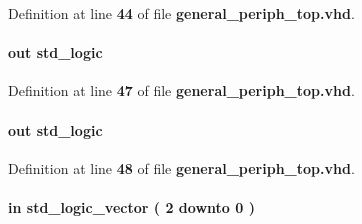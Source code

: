 Definition at line {\bf 44} of file {\bf general\+\_\+periph\+\_\+top.\+vhd}.

\paragraph[{led2\+\_\+g}]{ {\bfseries \textcolor{keywordflow}{out}\textcolor{vhdlchar}{ }} {\bfseries \textcolor{comment}{std\+\_\+logic}\textcolor{vhdlchar}{ }} \hspace{0.3cm}{\ttfamily [Port]}}\label{classgeneral__periph__top_a6b99286e836c933c4ee24d7e06ad22ed}


Definition at line {\bf 47} of file {\bf general\+\_\+periph\+\_\+top.\+vhd}.

\paragraph[{led2\+\_\+r}]{ {\bfseries \textcolor{keywordflow}{out}\textcolor{vhdlchar}{ }} {\bfseries \textcolor{comment}{std\+\_\+logic}\textcolor{vhdlchar}{ }} \hspace{0.3cm}{\ttfamily [Port]}}\label{classgeneral__periph__top_ada6ae8025a53618f0e28352b7c92c7f1}


Definition at line {\bf 48} of file {\bf general\+\_\+periph\+\_\+top.\+vhd}.

\paragraph[{led3\+\_\+ctrl}]{ {\bfseries \textcolor{keywordflow}{in}\textcolor{vhdlchar}{ }} {\bfseries \textcolor{comment}{std\+\_\+logic\+\_\+vector}\textcolor{vhdlchar}{ }\textcolor{vhdlchar}{(}\textcolor{vhdlchar}{ }\textcolor{vhdlchar}{ } \textcolor{vhdldigit}{2} \textcolor{vhdlchar}{ }\textcolor{keywordflow}{downto}\textcolor{vhdlchar}{ }\textcolor{vhdlchar}{ } \textcolor{vhdldigit}{0} \textcolor{vhdlchar}{ }\textcolor{vhdlchar}{)}\textcolor{vhdlchar}{ }} \hspace{0.3cm}{\ttfamily [Port]}}\label{classgeneral__periph__top_ad2405006b055fcf20c4adbcb811dc97c}


